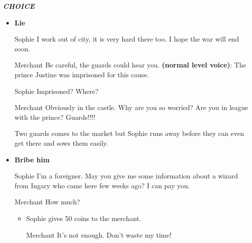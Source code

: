\textit{\textbf{CHOICE}}
\begin{itemize}
\item \textbf{Lie}
  
\begin{screenplay}

\begin{dialogue}{Sophie}
I work out of city, it is very hard there too. I hope the war will end soon.
\end{dialogue}
  
\begin{dialogue}{Merchant}
Be careful, the guards could hear you. \textbf{(normal level voice)}: The prince Justine was imprisoned for this cause.
\end{dialogue}
  
\begin{dialogue}[worried]{Sophie}
Imprisoned? Where? 
\end{dialogue}

\begin{dialogue}{Merchant}
Obviously in the castle. Why are you so worried? Are you in league with the prince? Guards!!!!
\end{dialogue}

  Two guards comes to the market but Sophie runs away before they can even get there and sows them easily.

\end{screenplay}
  
\item \textbf{Bribe him}
  
\begin{screenplay}

\begin{dialogue}[persuasive]{Sophie}
I'm a foreigner. May you give me some information about a wizard from Ingary who came here few weeks ago? I can pay you.
\end{dialogue}
  
\begin{dialogue}{Merchant}
How much?
\end{dialogue}

\end{screenplay}
  
  \begin{itemize}
  \item Sophie gives 50 coins to the merchant.

\begin{screenplay}

\begin{dialogue}[annoyed]{Merchant}
It’s not enough. Don’t waste my time!\\
\end{dialogue}


\end{screenplay}
\end{itemize}
\end{itemize}
